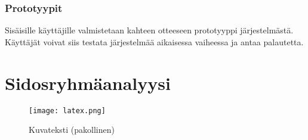         \subsubsection*{Prototyypit}

        Sisäisille käyttäjille valmistetaan kahteen otteeseen prototyyppi järjestelmästä. Käyttäjät voivat siis testata järjestelmää aikaisessa vaiheessa ja antaa palautetta.
	
\section{Sidosryhmäanalyysi}

        \begin{figure}[H] %
		\centering
		\texttt{[image: latex.png]}
		\caption{Kuvateksti (pakollinen)} %
		\label{img:mikätämäkuvaon}
	\end{figure}

